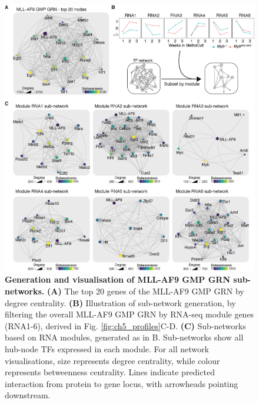 \begin{figure}[htbp]
    \centering
    \includegraphics[width=\textwidth,height=\textheight,keepaspectratio]{figures/chapter5/ch5_grn-vis.png}
    \caption[{Generation and visualisation of MLL-AF9 GMP GRN sub-networks.}]
    {\textbf{Generation and visualisation of MLL-AF9 GMP GRN sub-networks.}
    \textbf{(A)} The top 20 genes of the MLL-AF9 GMP GRN by degree centrality.  
    \textbf{(B)} Illustration of sub-network generation, by filtering the overall MLL-AF9 GMP GRN by RNA-seq module genes (RNA1-6), derived in Fig. \ref{fig:ch5_profiles}C-D. 
    \textbf{(C)} Sub-networks based on RNA modules, generated as in B. Sub-networks show all hub-node TFs expressed in each module. 
    For all network visualisations, size represents degree centrality, while colour represents betweenness centrality. Lines indicate predicted interaction from protein to gene locus, with arrowheads pointing downstream. 
    }
    \label{fig:ch5_grn-vis}
\end{figure}

